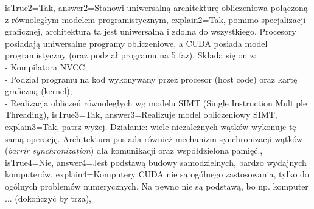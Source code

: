 \begin{enumerate}
\begin{minipage}{\textwidth}
{		isTrue2={Tak},%
		answer2={Stanowi uniwersalną architekturę obliczeniowa połączoną z równoległym modelem programistycznym},%
		explain2={Tak, pomimo specjalizacji graficznej, architektura ta jest uniwersalna i zdolna do wszystkiego. Procesory posiadają uniwersalne programy obliczeniowe, a CUDA posiada model programistyczny (oraz podział programu na 5 faz). Składa się on z:\\- Kompilatora NVCC;\\- Podział programu na kod wykonywany przez procesor (host code) oraz kartę graficzną (kernel);\\- Realizacja obliczeń równoległych wg modelu SIMT (Single Instruction Multiple Threading)},%
		isTrue3={Tak},%
		answer3={Realizuje model obliczeniowy SIMT},%
		explain3={Tak, patrz wyżej. Działanie: wiele niezależnych wątków wykonuje tę samą operację. Architektura posiada również mechanizm synchronizacji wątków (\emph{barrir synchronization}) dla komunikacji oraz współdzielona pamięć.},%
		isTrue4={Nie},%
		answer4={Jest podstawą budowy samodzielnych, bardzo wydajnych komputerów},%
		explain4={Komputery CUDA nie są ogólnego zastosowania, tylko do ogólnych problemów numerycznych. Na pewno nie są podstawą, bo np. komputer ... (dokończyć by trza)},%
	}
\end{minipage}
\begin{minipage}{\textwidth}
\end{minipage}
\begin{minipage}{\textwidth}
\end{minipage}
\end{enumerate}
